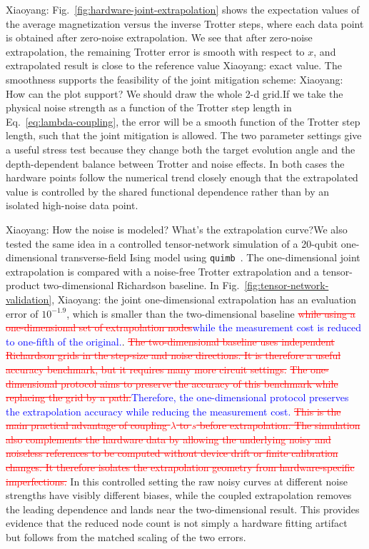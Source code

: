 \documentclass[aps,pra,reprint,superscriptaddress]{revtex4-2}
\newcommand{\figref}[1]{Fig.~\ref{#1}}
\newcommand{\corr}[2]{\textcolor{red}{\sout{#1}}\textcolor{blue}{#2}}
\newcommand{\del}[1]{\textcolor{red}{\sout{#1}}}
\newcommand{\wxy}[1]{{\color{red} Xiaoyang: #1}}
\begin{document}
\wxy{\figref{fig:hardware-joint-extrapolation} shows the expectation values of the average magnetization versus the inverse Trotter steps, where each data point is obtained after zero-noise extrapolation. We see that} after zero-noise extrapolation, the remaining Trotter error is smooth with respect to $x$, and extrapolated result is close to the reference value\wxy{exact value}.
The smoothness supports the feasibility of the joint mitigation scheme: \wxy{How can the plot support? We should draw the whole 2-d grid.}If we take the physical noise strength as a function of the Trotter step length in Eq.~\eqref{eq:lambda-coupling}, the error will be a smooth function of the Trotter step length, such that the joint mitigation is allowed. The two parameter settings give a useful stress test because they change both the target evolution angle and the depth-dependent balance between Trotter and noise effects.
In both cases the hardware points follow the numerical trend closely enough that the extrapolated value is controlled by the shared functional dependence rather than by an isolated high-noise data point.

\wxy{How the noise is modeled? What's the extrapolation curve?}We also tested the same idea in a controlled tensor-network simulation of a 20-qubit one-dimensional transverse-field Ising model using \texttt{quimb}~\cite{Gray2018}.
The one-dimensional joint extrapolation is compared with a noise-free Trotter extrapolation and a tensor-product two-dimensional Richardson baseline.
In Fig.~\ref{fig:tensor-network-validation}, \wxy{the joint one-dimensional extrapolation has an evaluation error of $10^{-1.9}$}, which is smaller than the two-dimensional baseline \corr{while using a one-dimensional set of extrapolation nodes}{while the measurement cost is reduced to one-fifth of the original.}.
\del{The two-dimensional baseline uses independent Richardson grids in the step-size and noise directions.
It is therefore a useful accuracy benchmark, but it requires many more circuit settings.}\corr{
The one-dimensional protocol aims to preserve the accuracy of this benchmark while replacing the grid by a path.}{Therefore, the one-dimensional protocol preserves the extrapolation accuracy while reducing the measurement cost.}
\del{This is the main practical advantage of coupling $\lambda$ to $s$ before extrapolation.
The simulation also complements the hardware data by allowing the underlying noisy and noiseless references to be computed without device drift or finite calibration changes.
It therefore isolates the extrapolation geometry from hardware-specific imperfections.}
In this controlled setting the raw noisy curves at different noise strengths have visibly different biases, while the coupled extrapolation removes the leading dependence and lands near the two-dimensional result.
This provides evidence that the reduced node count is not simply a hardware fitting artifact but follows from the matched scaling of the two errors.
\end{document}
